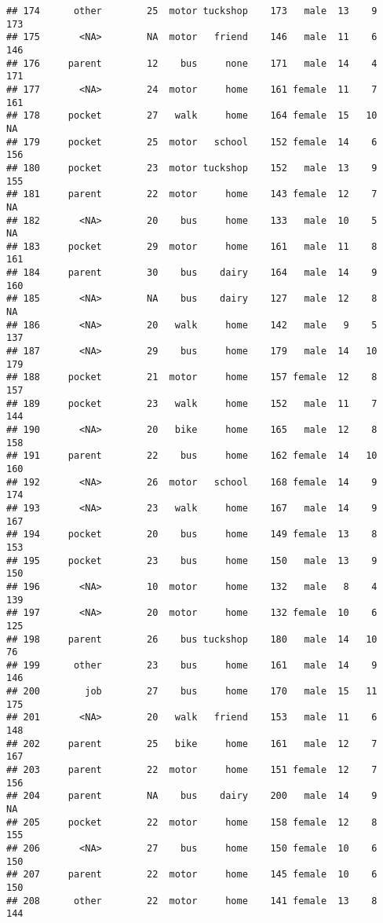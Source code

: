 \documentclass[
]{article}
\begin{document}
\begin{verbatim}
## 174      other        25  motor tuckshop    173   male  13    9     173
## 175       <NA>        NA  motor   friend    146   male  11    6     146
## 176     parent        12    bus     none    171   male  14    4     171
## 177       <NA>        24  motor     home    161 female  11    7     161
## 178     pocket        27   walk     home    164 female  15   10      NA
## 179     pocket        25  motor   school    152 female  14    6     156
## 180     pocket        23  motor tuckshop    152   male  13    9     155
## 181     parent        22  motor     home    143 female  12    7      NA
## 182       <NA>        20    bus     home    133   male  10    5      NA
## 183     pocket        29  motor     home    161   male  11    8     161
## 184     parent        30    bus    dairy    164   male  14    9     160
## 185       <NA>        NA    bus    dairy    127   male  12    8      NA
## 186       <NA>        20   walk     home    142   male   9    5     137
## 187       <NA>        29    bus     home    179   male  14   10     179
## 188     pocket        21  motor     home    157 female  12    8     157
## 189     pocket        23   walk     home    152   male  11    7     144
## 190       <NA>        20   bike     home    165   male  12    8     158
## 191     parent        22    bus     home    162 female  14   10     160
## 192       <NA>        26  motor   school    168 female  14    9     174
## 193       <NA>        23   walk     home    167   male  14    9     167
## 194     pocket        20    bus     home    149 female  13    8     153
## 195     pocket        23    bus     home    150   male  13    9     150
## 196       <NA>        10  motor     home    132   male   8    4     139
## 197       <NA>        20  motor     home    132 female  10    6     125
## 198     parent        26    bus tuckshop    180   male  14   10      76
## 199      other        23    bus     home    161   male  14    9     146
## 200        job        27    bus     home    170   male  15   11     175
## 201       <NA>        20   walk   friend    153   male  11    6     148
## 202     parent        25   bike     home    161   male  12    7     167
## 203     parent        22  motor     home    151 female  12    7     156
## 204     parent        NA    bus    dairy    200   male  14    9      NA
## 205     pocket        22  motor     home    158 female  12    8     155
## 206       <NA>        27    bus     home    150 female  10    6     150
## 207     parent        22  motor     home    145 female  10    6     150
## 208      other        22  motor     home    141 female  13    8     144

\end{verbatim}
\end{document}
